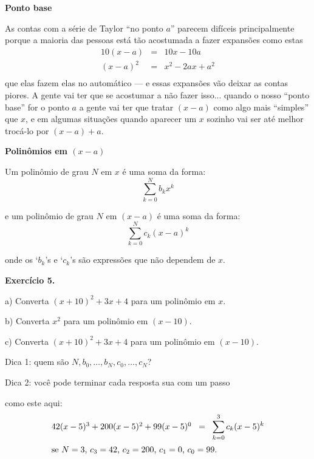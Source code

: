 \documentclass[oneside,12pt]{article}
\begin{document}
\newpage


{\bf Ponto base}

As contas com a série de Taylor ``no ponto $a$'' parecem difíceis
principalmente porque a maioria das pessoas está tão acostumada a
fazer expansões como estas
%
$$\begin{array}{rcl}
  10(x-a) &=& 10x - 10a \\
  (x-a)^2 &=& x^2 - 2ax + a^2 \\
  \end{array}
$$
%
que elas fazem elas no automático --- e essas expansões vão deixar as
contas  piores. A gente vai ter que se acostumar a
não fazer isso... quando o nosso ``ponto base'' for o ponto $a$ a
gente vai ter que tratar $(x-a)$ como algo mais ``simples'' que $x$, e
em algumas situações quando aparecer um $x$ sozinho vai ser até melhor
trocá-lo por $(x-a)+a$.

\newpage


{\bf Polinômios em $(x-a)$}

\ssk

Um polinômio de grau $N$ em $x$ é uma soma da forma:
%
$$\sum_{k=0}^{N} b_k x^k$$

e um polinômio de grau $N$ em $(x-a)$ é uma soma da forma:
%
$$\sum_{k=0}^{N} c_k (x-a)^k$$

onde os `$b_k$'s e `$c_k$'s são expressões que não dependem de $x$.

\msk

\newpage


{\bf Exercício 5.}

a) Converta $(x+10)^2 + 3x + 4$ para um polinômio em $x$. 

b) Converta $x^2$ para um polinômio em $(x-10)$.

c) Converta $(x+10)^2 + 3x + 4$ para um polinômio em $(x-10)$.

\bsk

Dica 1: quem são $N, b_0, \ldots, b_N, c_0, \ldots, c_N$?

Dica 2: você pode terminar cada resposta sua com um passo

como este aqui:
%
$$\begin{array}{l}
  42(x-5)^3 + 200(x-5)^2 + 99(x-5)^0 \;\; = \;\; \displaystyle \sum_{k=0}^3 c_k (x-5)^k \\[15pt]
  \text{se $N=3$, $c_3=42$, $c_2=200$, $c_1=0$, $c_0=99$.} 
  \end{array}
$$
\end{document}
